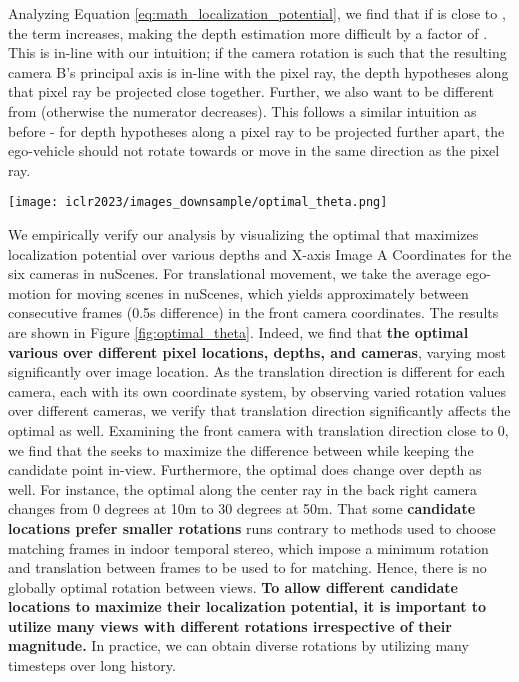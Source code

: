 \documentclass[runningheads, hyperfootnotes=false]{article}
\begin{document}
Analyzing Equation \ref{eq:math_localization_potential}, we find that if  is close to , the  term increases, making the depth estimation more difficult by a factor of . This is in-line with our intuition; if the camera rotation is such that the resulting camera B's principal axis is in-line with the pixel ray, the depth hypotheses along that pixel ray be projected close together. Further, we also want  to be different from  (otherwise the numerator decreases). This follows a similar intuition as before - for depth hypotheses along a pixel ray to be projected further apart, the ego-vehicle should not rotate towards or move in the same direction as the pixel ray. 

\begin{figure*}[t]
  \centering
  \texttt{[image: iclr2023/images\_downsample/optimal\_theta.png]}
  \captionsetup{aboveskip=0pt}\captionsetup{belowskip=0pt}
  \caption{We visualize the optimal theta for various candidate locations.}
  \label{fig:optimal_theta}
\end{figure*} 
We empirically verify our analysis by visualizing the optimal  that maximizes localization potential over various depths and X-axis Image A Coordinates for the six cameras in nuScenes. For translational movement, we take the average ego-motion for moving scenes in nuScenes, which yields approximately  between consecutive frames (0.5s difference) in the front camera coordinates. The results are shown in Figure \ref{fig:optimal_theta}. Indeed, we find that \textbf{the optimal  various over different pixel locations, depths, and cameras}, varying most significantly over image location. As the translation direction  is different for each camera, each with its own coordinate system, by observing varied rotation values over different cameras, we verify that translation direction significantly affects the optimal  as well. Examining the front camera with translation direction  close to 0, we find that the  seeks to maximize the difference between  while keeping the candidate point in-view. Furthermore, the optimal  does change over depth as well. For instance, the optimal  along the center ray in the back right camera changes from 0 degrees at 10m to 30 degrees at 50m. That some \textbf{candidate locations prefer smaller rotations} runs contrary to methods used to choose matching frames in indoor temporal stereo, which impose a minimum rotation and translation \citep{Hou2019MultiViewSB,Sun2021NeuralReconRC} between frames to be used to for matching. Hence, there is no globally optimal rotation between views. \textbf{To allow different candidate locations to maximize their localization potential, it is important to utilize many views with different rotations irrespective of their magnitude.} In practice, we can obtain diverse rotations by utilizing many timesteps over long history.
\end{document}

